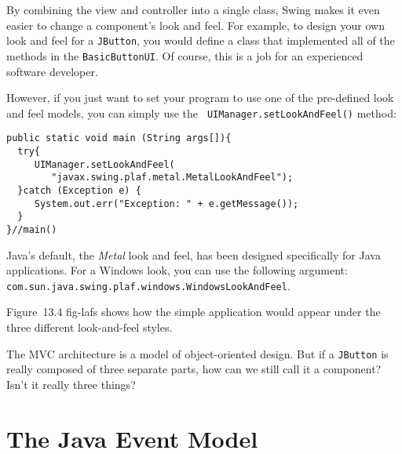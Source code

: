 By combining the view and controller into a single class, Swing makes
it even easier to change a component's look and feel.  For example, to
design your own look and feel for a {\tt JButton}, you would define a
class that implemented all of the methods in the
{\tt BasicButtonUI}. Of course, this is a job for an experienced software
developer.

However, if you just want to set your program to use one of the
pre-defined look and feel models, you can simply use the {\tt
UIManager.set\-LookAndFeel()} method:

\begin{jjjlisting}
\begin{lstlisting}
public static void main (String args[]){
  try{
     UIManager.setLookAndFeel(
        "javax.swing.plaf.metal.MetalLookAndFeel");
  }catch (Exception e) {
     System.out.err("Exception: " + e.getMessage());
  }
}//main()
\end{lstlisting}
\end{jjjlisting}

Java's default, the {\it Metal} look and feel, has been designed
specifically for Java applications.  For a Windows look, you can use
the following argument:
\verb|com.sun.java.swing.plaf.windows.WindowsLookAndFeel|.\break

\noindent Figure~13.4
 {fig-lafs}
shows how the simple application would appear under the
three different look-and-feel styles.



\label{self-study-exercise}
\begin{SSTUDY}

\item  The MVC architecture is a model of object-oriented design.  But if a
{\tt JButton} is really composed of three separate parts, how can we
still call it a component? Isn't it really three things?

\end{SSTUDY}

\section{The Java Event Model}
\label{the-java-event-model}

